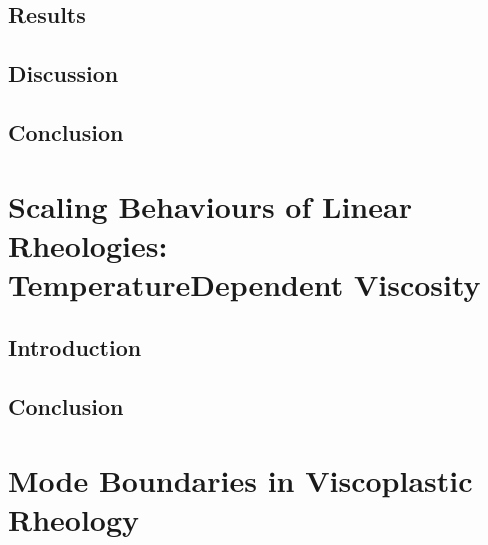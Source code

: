 \documentclass[letterpaper,10pt,english]{jupyterBook}
\begin{document}
\section{Results}
\label{\detokenize{content/chapter_04_isoviscous/results/intro:results}}\label{\detokenize{content/chapter_04_isoviscous/results/intro::doc}}

\section{Discussion}
\label{\detokenize{content/chapter_04_isoviscous/discussion/intro:discussion}}\label{\detokenize{content/chapter_04_isoviscous/discussion/intro::doc}}

\section{Conclusion}
\label{\detokenize{content/chapter_04_isoviscous/conclusion:conclusion}}\label{\detokenize{content/chapter_04_isoviscous/conclusion::doc}}

\chapter{Scaling Behaviours of Linear Rheologies: Temperature\sphinxhyphen{}Dependent Viscosity}
\label{\detokenize{content/chapter_05_arrhenius/abstract:scaling-behaviours-of-linear-rheologies-temperature-dependent-viscosity}}\label{\detokenize{content/chapter_05_arrhenius/abstract::doc}}

\section{Introduction}
\label{\detokenize{content/chapter_05_arrhenius/introduction:introduction}}\label{\detokenize{content/chapter_05_arrhenius/introduction::doc}}

\section{Conclusion}
\label{\detokenize{content/chapter_05_arrhenius/conclusion:conclusion}}\label{\detokenize{content/chapter_05_arrhenius/conclusion::doc}}

\chapter{Mode Boundaries in Viscoplastic Rheology}
\label{\detokenize{content/chapter_06_viscoplastic/abstract:mode-boundaries-in-viscoplastic-rheology}}\label{\detokenize{content/chapter_06_viscoplastic/abstract::doc}}
\end{document}
